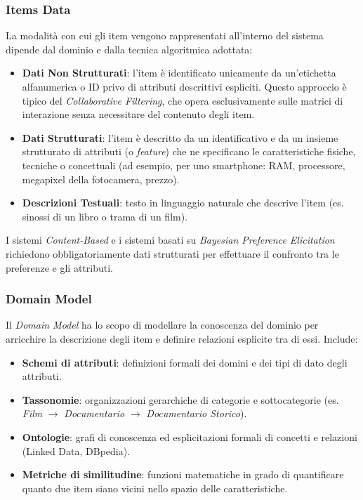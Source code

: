 \subsubsection{Items Data}
La modalità con cui gli item vengono rappresentati all'interno del sistema dipende dal dominio e dalla tecnica algoritmica adottata:
\begin{itemize}
    \item \textbf{Dati Non Strutturati}: l'item è identificato unicamente da un'etichetta alfanumerica o ID privo di attributi descrittivi espliciti. Questo approccio è tipico del \textit{Collaborative Filtering}, che opera esclusivamente sulle matrici di interazione senza necessitare del contenuto degli item.
    \item \textbf{Dati Strutturati}: l'item è descritto da un identificativo e da un insieme strutturato di attributi (o \textit{feature}) che ne specificano le caratteristiche fisiche, tecniche o concettuali (ad esempio, per uno smartphone: RAM, processore, megapixel della fotocamera, prezzo).
    \item \textbf{Descrizioni Testuali}: testo in linguaggio naturale che descrive l'item (es. sinossi di un libro o trama di un film).
\end{itemize}

I sistemi \textit{Content-Based} e i sistemi basati su \textit{Bayesian Preference Elicitation} richiedono obbligatoriamente dati strutturati per effettuare il confronto tra le preferenze e gli attributi.

\subsubsection{Domain Model}
Il \textit{Domain Model} ha lo scopo di modellare la conoscenza del dominio per arricchire la descrizione degli item e definire relazioni esplicite tra di essi. Include:
\begin{itemize}
    \item \textbf{Schemi di attributi}: definizioni formali dei domini e dei tipi di dato degli attributi.
    \item \textbf{Tassonomie}: organizzazioni gerarchiche di categorie e sottocategorie (es. \textit{Film} $\rightarrow$ \textit{Documentario} $\rightarrow$ \textit{Documentario Storico}).
    \item \textbf{Ontologie}: grafi di conoscenza ed esplicitazioni formali di concetti e relazioni (Linked Data, DBpedia).
    \item \textbf{Metriche di similitudine}: funzioni matematiche in grado di quantificare quanto due item siano vicini nello spazio delle caratteristiche.
\end{itemize}

